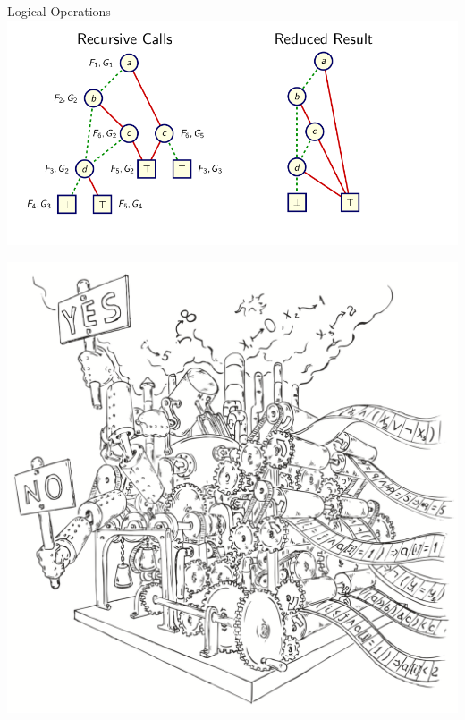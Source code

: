 \documentclass{beamer}
\begin{document}
\begin{frame}{Logical Operations}
\includegraphics[scale=0.35]{ex7.png}
\end{frame}

\begin{frame}
\includegraphics[scale=0.5]{../decision-procedure.png}
\end{frame}
\end{document}
